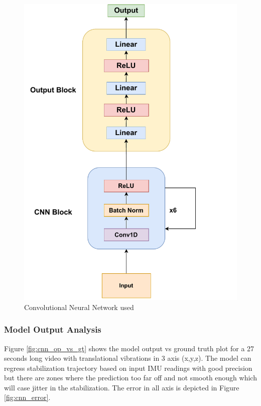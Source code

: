 \begin{figure}
    \centering
    \includegraphics[scale=0.75]{images/fig_chapter2/nns/cnn_mt.pdf}
    \caption{Convolutional Neural Network used}
    \label{fig:cnn_used}
\end{figure}

\subsubsection{Model Output Analysis}
Figure \ref{fig:cnn_op_vs_gt} shows the model output vs ground truth plot for a 27 seconds long video with translational vibrations in 3 axis (x,y,z). The model can regress stabilization trajectory based on input IMU readings with good precision but there are zones where the prediction too far off and not smooth enough which will case jitter in the stabilization. The error in all axis is depicted in Figure \ref{fig:cnn_error}.

